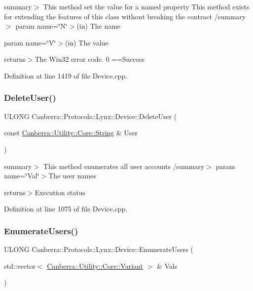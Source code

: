 summary$>$ This method set the value for a named property This method exists for extending the features of this class without breaking the contract /summary$>$ param name=\char`\"{}\+N\char`\"{}$>$(in) The name

param name=\char`\"{}\+V\char`\"{}$>$(in) The value

returns$>$The Win32 error code. 0 ==Success

Definition at line 1419 of file Device.\+cpp.

\mbox{\label{class_canberra_1_1_protocols_1_1_lynx_1_1_device_a3e7d53d8358f59ac34c6d69fe97a200c_a3e7d53d8358f59ac34c6d69fe97a200c}} 
\subsubsection{\texorpdfstring{Delete\+User()}{DeleteUser()}}
{\footnotesize\ttfamily U\+L\+O\+NG Canberra\+::\+Protocols\+::\+Lynx\+::\+Device\+::\+Delete\+User (\begin{DoxyParamCaption}\item[{const \hyperlink{class_canberra_1_1_utility_1_1_core_1_1_string}{Canberra\+::\+Utility\+::\+Core\+::\+String} \&}]{User }\end{DoxyParamCaption})}

summary$>$ This method enumerates all user accounts /summary$>$ param name=\char`\"{}\+Val\char`\"{}$>$The user names

returns$>$Execution status

Definition at line 1075 of file Device.\+cpp.

\mbox{\label{class_canberra_1_1_protocols_1_1_lynx_1_1_device_a62e3acd5c9efc70381c37ea94060d648_a62e3acd5c9efc70381c37ea94060d648}} 
\subsubsection{\texorpdfstring{Enumerate\+Users()}{EnumerateUsers()}}
{\footnotesize\ttfamily U\+L\+O\+NG Canberra\+::\+Protocols\+::\+Lynx\+::\+Device\+::\+Enumerate\+Users (\begin{DoxyParamCaption}\item[{std\+::vector$<$ \hyperlink{class_canberra_1_1_utility_1_1_core_1_1_variant}{Canberra\+::\+Utility\+::\+Core\+::\+Variant} $>$ \&}]{Vals }\end{DoxyParamCaption})}

